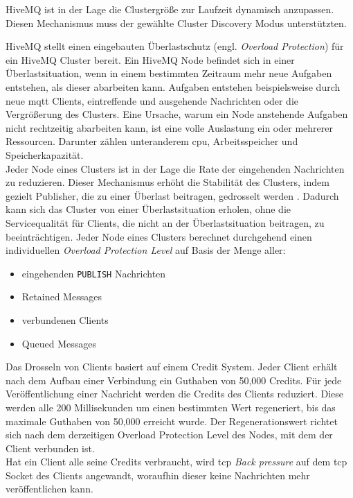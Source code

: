 HiveMQ ist in der Lage die Clustergrö{\ss}e zur Laufzeit dynamisch anzupassen. Diesen Mechanismus muss der gewählte Cluster Discovery Modus unterstützten.
\cite{HiveMQClusterHiveMQ}

 \label{sb:overload-protection}
HiveMQ stellt einen eingebauten Überlastschutz (engl. \textit{Overload Protection}) für ein HiveMQ Cluster bereit.
Ein HiveMQ Node befindet sich in einer Überlastsituation, wenn in einem bestimmten Zeitraum mehr neue Aufgaben entstehen, als dieser abarbeiten kann. Aufgaben entstehen beispielsweise durch neue \ac{mqtt} Clients, eintreffende und ausgehende Nachrichten oder die Vergrö{\ss}erung des Clusters.
Eine Ursache, warum ein Node anstehende Aufgaben nicht rechtzeitig abarbeiten kann, ist eine volle Auslastung ein oder mehrerer Ressourcen. Darunter zählen unteranderem \ac{cpu}, Arbeitsspeicher und Speicherkapazität.
\\
Jeder Node eines Clusters ist in der Lage die Rate der eingehenden Nachrichten zu reduzieren. Dieser Mechanismus erhöht die Stabilität des Clusters, indem gezielt Publisher, die zu einer Überlast beitragen, gedrosselt werden \cite{ClusterOverloadProtection}.
Dadurch kann sich das Cluster von einer Überlastsituation erholen, ohne die Servicequalität für Clients, die nicht an der Überlastsituation beitragen, zu beeinträchtigen.
Jeder Node eines Clusters berechnet durchgehend einen individuellen \textit{Overload Protection Level} auf Basis der Menge aller:
\begin{itemize}
    \item eingehenden \verb|PUBLISH| Nachrichten
    \item Retained Messages
    \item verbundenen Clients
    \item Queued Messages
\end{itemize}
Das Drosseln von Clients basiert auf einem Credit System. Jeder Client erhält nach dem Aufbau einer Verbindung ein Guthaben von 50,000 Credits.
Für jede Veröffentlichung einer Nachricht werden die Credits des Clients reduziert.
Diese werden alle 200 Millisekunden um einen bestimmten Wert regeneriert, bis das maximale Guthaben von 50,000 erreicht wurde. Der Regenerationswert richtet sich nach dem derzeitigen Overload Protection Level des Nodes, mit dem der Client verbunden ist.
\cite{ClusterOverloadProtection}
\\
Hat ein Client alle seine Credits verbraucht, wird \ac{tcp} \textit{Back pressure} auf dem \ac{tcp} Socket des Clients angewandt, woraufhin dieser keine Nachrichten mehr veröffentlichen kann.
